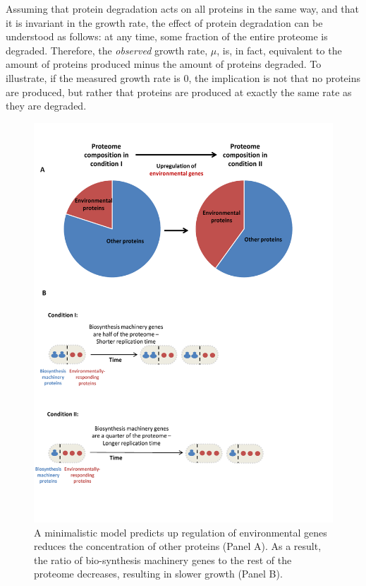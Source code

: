 \documentclass[a4paper,landscape,titlepage,17pt]{extarticle}
\begin{document}
Assuming that protein degradation acts on all proteins in the same way, and that it is invariant in the growth rate, the effect of protein degradation can be understood as follows: at any time, some fraction of the entire proteome is degraded.
Therefore, the \emph{observed} growth rate, $\mu$, is, in fact, equivalent to the amount of proteins produced minus the amount of proteins degraded.
To illustrate, if the measured growth rate is 0, the implication is not that no proteins are produced, but rather that proteins are produced at exactly the same rate as they are degraded.
\clearpage
\begin{landscape}
\begin{figure}[h]
\centering
\includegraphics[scale=0.9]{Figures7-trieste.pdf}
\caption{\linespread{0.5}\selectfont{}
  A minimalistic model predicts up regulation of environmental genes reduces the concentration of other proteins (Panel A).
As a result, the ratio of bio-synthesis machinery genes to the rest of the proteome decreases, resulting in slower growth (Panel B).
}
\label{fig:model}
\end{figure}
\end{landscape}
\clearpage        


\printbibliography
\end{document}
